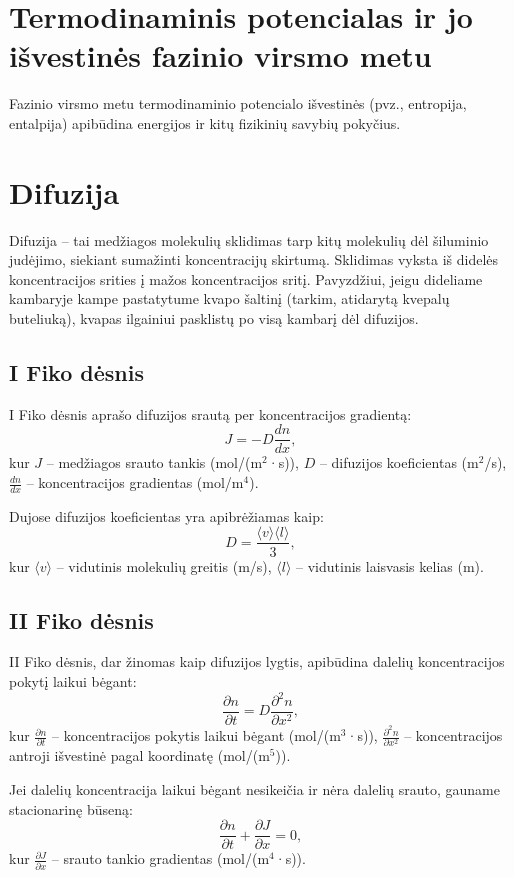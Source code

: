 \documentclass[a4paper,12pt]{article}
\begin{document}
\section{Termodinaminis potencialas ir jo išvestinės fazinio virsmo metu}
Fazinio virsmo metu termodinaminio potencialo išvestinės (pvz., entropija, entalpija) apibūdina energijos ir kitų fizikinių savybių pokyčius.

\section{Difuzija}

Difuzija – tai medžiagos molekulių sklidimas tarp kitų molekulių dėl šiluminio judėjimo, siekiant sumažinti koncentracijų skirtumą. Sklidimas vyksta iš didelės koncentracijos srities į mažos koncentracijos sritį. Pavyzdžiui, jeigu dideliame kambaryje kampe pastatytume kvapo šaltinį (tarkim, atidarytą kvepalų buteliuką), kvapas ilgainiui pasklistų po visą kambarį dėl difuzijos.

\subsection{I Fiko dėsnis}
I Fiko dėsnis aprašo difuzijos srautą per koncentracijos gradientą:
\[
J = -D \frac{dn}{dx},
\]
kur $J$ – medžiagos srauto tankis (mol/(m\(^2\)·s)), $D$ – difuzijos koeficientas (m\(^2\)/s), $\frac{dn}{dx}$ – koncentracijos gradientas (mol/m\(^4\)).

Dujose difuzijos koeficientas yra apibrėžiamas kaip:
\[
D = \frac{\langle v \rangle \langle l \rangle}{3},
\]
kur $\langle v \rangle$ – vidutinis molekulių greitis (m/s), $\langle l \rangle$ – vidutinis laisvasis kelias (m).

\subsection{II Fiko dėsnis}
II Fiko dėsnis, dar žinomas kaip difuzijos lygtis, apibūdina dalelių koncentracijos pokytį laikui bėgant:
\[
\frac{\partial n}{\partial t} = D \frac{\partial^2 n}{\partial x^2},
\]
kur $\frac{\partial n}{\partial t}$ – koncentracijos pokytis laikui bėgant (mol/(m\(^3\)·s)), $\frac{\partial^2 n}{\partial x^2}$ – koncentracijos antroji išvestinė pagal koordinatę (mol/(m\(^5\))).

Jei dalelių koncentracija laikui bėgant nesikeičia ir nėra dalelių srauto, gauname stacionarinę būseną:
\[
\frac{\partial n}{\partial t} + \frac{\partial J}{\partial x} = 0,
\]
kur $\frac{\partial J}{\partial x}$ – srauto tankio gradientas (mol/(m\(^4\)·s)).
\end{document}
